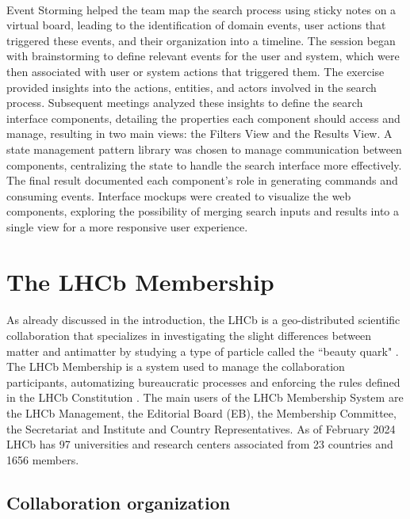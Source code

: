 \paragraph{} Event Storming helped the team map the search process using sticky notes on a virtual board, leading to the identification of domain events, user actions that triggered these events, and their organization into a timeline. The session began with brainstorming to define relevant events for the user and system, which were then associated with user or system actions that triggered them. The exercise provided insights into the actions, entities, and actors involved in the search process. Subsequent meetings analyzed these insights to define the search interface components, detailing the properties each component should access and manage, resulting in two main views: the Filters View and the Results View. A state management pattern library was chosen to manage communication between components, centralizing the state to handle the search interface more effectively. The final result documented each component's role in generating commands and consuming events. Interface mockups were created to visualize the web components, exploring the possibility of merging search inputs and results into a single view for a more responsive user experience.


\section{The LHCb Membership}
\paragraph{} As already discussed in the introduction, the LHCb is a geo-distributed scientific collaboration that specializes in investigating the slight differences between matter and antimatter by studying a type of particle called the ``beauty quark" \cite{LHCb_Description}. The LHCb Membership is a system used to manage the collaboration participants, automatizing bureaucratic processes and enforcing the rules defined in the LHCb Constitution \cite{LHCbConstitution}. The main users of the LHCb Membership System are the LHCb Management, the Editorial Board (EB), the Membership Committee, the Secretariat and Institute and Country Representatives. As of February 2024 LHCb has 97 universities and research centers associated from 23 countries and 1656 members.

\subsection{Collaboration organization}

